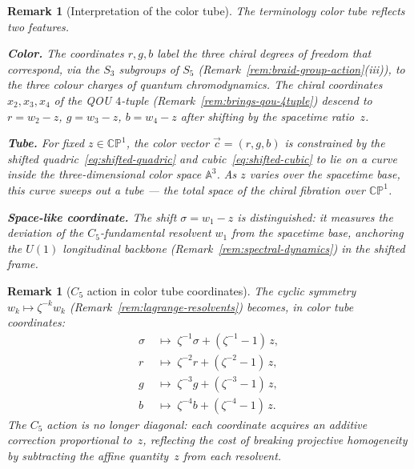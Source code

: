 \documentclass[12pt,a4paper]{report}
\newtheorem{remark}[theorem]{Remark}
\begin{document}
\begin{remark}[Interpretation of the color tube]
\label{rem:color-tube-interpretation}
  The terminology \emph{color tube} reflects two features.

  \medskip
  \noindent\textbf{Color.}\;
  The coordinates $r, g, b$ label the three chiral degrees of freedom
  that correspond, via the $S_3$ subgroups of $S_5$
  (Remark~\ref{rem:braid-group-action}\textup{(iii)}), to the three
  colour charges of quantum chromodynamics.  The chiral coordinates
  $x_2, x_3, x_4$ of the QOU $4$-tuple
  (Remark~\ref{rem:brings-qou-4tuple}) descend to $r = w_2 - z$,
  $g = w_3 - z$, $b = w_4 - z$ after shifting by the spacetime ratio~$z$.

  \medskip
  \noindent\textbf{Tube.}\;
  For fixed $z \in \mathbb{CP}^1$, the color vector $\vec{c} = (r, g, b)$
  is constrained by the shifted quadric~\eqref{eq:shifted-quadric} and
  cubic~\eqref{eq:shifted-cubic} to lie on a curve inside the
  three-dimensional color space $\mathbb{A}^3$.  As $z$ varies over the
  spacetime base, this curve sweeps out a tube --- the total space of
  the chiral fibration over $\mathbb{CP}^1$.

  \medskip
  \noindent\textbf{Space-like coordinate.}\;
  The shift $\sigma = w_1 - z$ is distinguished: it measures the deviation
  of the $C_5$-fundamental resolvent $w_1$ from the spacetime base,
  anchoring the $U(1)$ longitudinal backbone
  (Remark~\ref{rem:spectral-dynamics}) in the shifted frame.
\end{remark}

\begin{remark}[$C_5$ action in color tube coordinates]
\label{rem:c5-color-tube}
  The cyclic symmetry $w_k \mapsto \zeta^{-k} w_k$
  (Remark~\ref{rem:lagrange-resolvents}) becomes, in color tube coordinates:
  \begin{align}
    \sigma &\;\longmapsto\; \zeta^{-1}\sigma + (\zeta^{-1}-1)\,z,
      \label{eq:c5-sigma}\\[4pt]
    r &\;\longmapsto\; \zeta^{-2}r + (\zeta^{-2}-1)\,z,
      \label{eq:c5-r}\\[4pt]
    g &\;\longmapsto\; \zeta^{-3}g + (\zeta^{-3}-1)\,z,
      \label{eq:c5-g}\\[4pt]
    b &\;\longmapsto\; \zeta^{-4}b + (\zeta^{-4}-1)\,z.
      \label{eq:c5-b}
  \end{align}
  The $C_5$ action is no longer diagonal: each coordinate acquires an
  additive correction proportional to~$z$, reflecting the cost of
  breaking projective homogeneity by subtracting the affine
  quantity~$z$ from each resolvent.
\end{remark}
\end{document}
